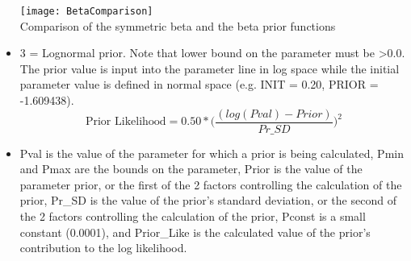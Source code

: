 \begin{itemize}
	\begin{center}
		\texttt{[image: BetaComparison]}\\
		Comparison of the symmetric beta and the beta prior functions
	\end{center}

	\item 3 = Lognormal prior.  Note that lower bound on the parameter must be >0.0. The prior value is input into the parameter line in log space while the initial parameter value is defined in normal space (e.g. INIT = 0.20, PRIOR = -1.609438).
	\begin{equation}
	\text{Prior Likelihood} = 0.50*\Big(\frac{(log(Pval)-Prior)}{Pr\_SD}\Big)^2
	\end{equation}
	\item Pval is the value of the parameter for which a prior is being calculated, Pmin and Pmax are the bounds on the parameter, Prior is the value of the parameter prior, or the first of the 2 factors controlling the calculation of the prior, Pr\_SD is the value of the prior's standard deviation, or the second of the 2 factors controlling the calculation of the prior, Pconst is a small constant (0.0001), and Prior\_Like is the calculated value of the prior's contribution to the log likelihood.
\end{itemize}
